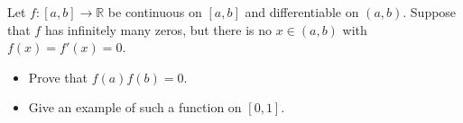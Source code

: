 Let \(f \colon  \left[ a, b\right]\to\mathbb{R}\) be continuous on \(\left[ a, b\right]\) and differentiable on \(\left( a, b\right)\). Suppose that \(f\) has infinitely many zeros, but there is no \(x\in \left( a, b\right)\) with \(f(x)=f'(x)=0\).
\begin{itemize}
\item[(a)] Prove that \(f(a)f(b)=0\).
\item[(b)] Give an example of such a function on \(\left[ 0, 1\right]\).
\end{itemize}
